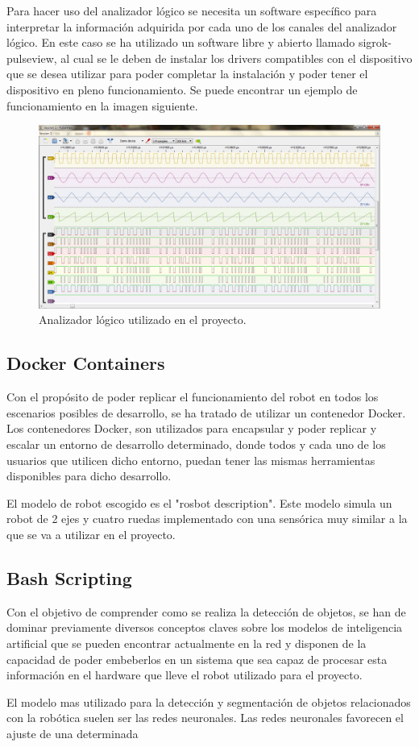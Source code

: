 Para hacer uso del analizador lógico se necesita un software específico para interpretar la información adquirida por cada uno de los canales del analizador lógico. En este caso se ha utilizado un software libre y abierto llamado sigrok-pulseview, al cual se le deben de instalar los drivers compatibles con el dispositivo que se desea utilizar para poder completar la instalación y poder tener el dispositivo en pleno funcionamiento. Se puede encontrar un ejemplo de funcionamiento en la imagen siguiente.

\begin{figure}[h]
    \centering
    \includegraphics[scale=0.3]{fig/pulseview.jpg}
    \caption{Analizador lógico utilizado en el proyecto.}
    \label{fig:mesh1}
\end{figure}

\subsection{Docker Containers}

Con el propósito de poder replicar el funcionamiento del robot en todos los escenarios posibles de desarrollo, se ha tratado de utilizar un contenedor Docker.
Los contenedores Docker, son utilizados para encapsular y poder replicar y escalar un entorno de desarrollo determinado, donde todos y cada uno de los usuarios que utilicen dicho entorno, puedan tener las mismas herramientas disponibles para dicho desarrollo.

El modelo de robot escogido es el "rosbot description". Este modelo simula un robot de 2 ejes y cuatro ruedas implementado con una sensórica muy similar a la que se va a utilizar en el proyecto.
\subsection{Bash Scripting}

Con el objetivo de comprender como se realiza la detección de objetos, se han de dominar previamente diversos conceptos claves sobre los modelos de inteligencia artificial que se pueden encontrar actualmente en la red y disponen de la capacidad de poder embeberlos en un sistema que sea capaz de procesar esta información en el hardware que lleve el robot utilizado para el proyecto.

El modelo mas utilizado para la detección y segmentación de objetos relacionados con la robótica suelen ser las redes neuronales. Las redes neuronales favorecen el ajuste de una determinada 